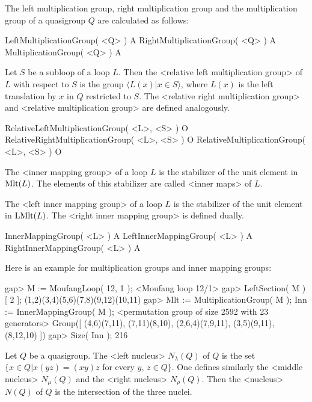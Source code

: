 The left multiplication group, right multiplication group and the
multiplication group of a quasigroup $Q$ are calculated as follows:

\>LeftMultiplicationGroup( <Q> ) A
\>RightMultiplicationGroup( <Q> ) A
\>MultiplicationGroup( <Q> ) A

Let $S$ be a subloop of a loop $L$. Then the <relative left multiplication group>
%
%
 of $L$ with respect to $S$ is the group $\langle L(x)|x\in S\rangle$, where
$L(x)$ is the left translation by $x$ in $Q$ restricted to $S$. The
<relative right multiplication group>
%
%
 and <relative multiplication group>
%
%
 are defined analogously.

\>RelativeLeftMultiplicationGroup( <L>, <S> ) O
\>RelativeRightMultiplicationGroup( <L>, <S> ) O
\>RelativeMultiplicationGroup( <L>, <S> ) O


The <inner mapping group>
%
%
 of a loop $L$ is the stabilizer of the
unit element in ${\rm{Mlt}}(L)$. The elements of this stabilizer are called
<inner maps> of $L$.

The <left inner mapping group>
%
%
 of a loop $L$ is the stabilizer of the unit
element in ${\rm{LMlt}}(L)$. The <right inner mapping group>
%
%
 is defined dually.

\>InnerMappingGroup( <L> ) A
\>LeftInnerMappingGroup( <L> ) A
\>RightInnerMappingGroup( <L> ) A

Here is an example for multiplication groups and inner mapping groups:

\beginexample
gap> M := MoufangLoop( 12, 1 );
<Moufang loop 12/1>
gap> LeftSection( M )[ 2 ];
(1,2)(3,4)(5,6)(7,8)(9,12)(10,11)
gap> Mlt := MultiplicationGroup( M ); Inn := InnerMappingGroup( M );
<permutation group of size 2592 with 23 generators>
Group([ (4,6)(7,11), (7,11)(8,10), (2,6,4)(7,9,11), (3,5)(9,11), (8,12,10) ])
gap> Size( Inn );
216
\endexample


Let $Q$ be a quasigroup. The <left nucleus>
%
%
 $N_\lambda(Q)$ of $Q$ is the
set $\{x\in Q| x(yz)=(xy)z$ for every $y$, $z\in Q\}$. One defines similarly
the <middle nucleus>
%
%
 $N_\mu(Q)$ and the <right nucleus>
%
%
 $N_\rho(Q)$.
Then the <nucleus>
%
%
$N(Q)$ of $Q$ is the intersection of the three nuclei.

